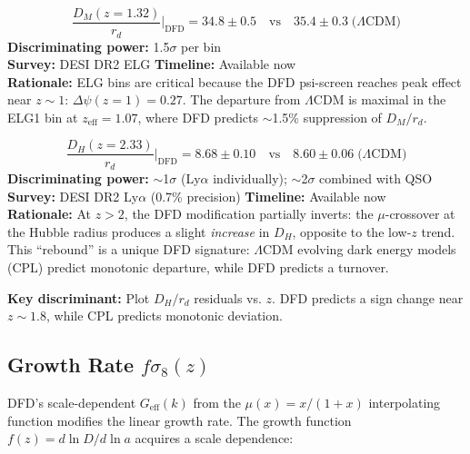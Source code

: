 \documentclass[12pt]{article}
\newcommand{\LCDM}{$\Lambda$CDM}
\begin{document}
\begin{predbox}[Prediction D3: BAO --- ELG ($z_\mathrm{eff}=1.07$, $1.32$)]
\begin{equation}
\boxed{
\frac{D_M(z=1.32)}{r_d}\bigg|_\mathrm{DFD} = 34.8 \pm 0.5 \quad\text{vs}\quad 35.4 \pm 0.3 \;\text{(\LCDM)}
}
\end{equation}
\textbf{Discriminating power:} 1.5$\sigma$ per bin\\
\textbf{Survey:} DESI DR2 ELG \quad\textbf{Timeline:} Available now\\
\textbf{Rationale:} ELG bins are critical because the DFD psi-screen reaches peak effect near $z\sim1$: $\Delta\psi(z=1)=0.27$. The departure from \LCDM{} is maximal in the ELG1 bin at $z_\mathrm{eff}=1.07$, where DFD predicts $\sim$1.5\% suppression of $D_M/r_d$.
\end{predbox}

\begin{predbox}[Prediction D4: BAO --- QSO ($z_\mathrm{eff}=1.49$) and Ly$\alpha$ ($z_\mathrm{eff}=2.33$)]
\begin{equation}
\boxed{
\frac{D_H(z=2.33)}{r_d}\bigg|_\mathrm{DFD} = 8.68 \pm 0.10 \quad\text{vs}\quad 8.60 \pm 0.06 \;\text{(\LCDM)}
}
\end{equation}
\textbf{Discriminating power:} $\sim$1$\sigma$ (Ly$\alpha$ individually); $\sim$2$\sigma$ combined with QSO\\
\textbf{Survey:} DESI DR2 Ly$\alpha$ (0.7\% precision) \quad\textbf{Timeline:} Available now\\
\textbf{Rationale:} At $z>2$, the DFD modification partially inverts: the $\mu$-crossover at the Hubble radius produces a slight \emph{increase} in $D_H$, opposite to the low-$z$ trend. This ``rebound'' is a unique DFD signature: \LCDM{} evolving dark energy models (CPL) predict monotonic departure, while DFD predicts a turnover.

\medskip\noindent
\textbf{Key discriminant:} Plot $D_H/r_d$ residuals vs. $z$. DFD predicts a sign change near $z\sim1.8$, while CPL predicts monotonic deviation.
\end{predbox}

\subsection{Growth Rate $f\sigma_8(z)$}

DFD's scale-dependent $G_\mathrm{eff}(k)$ from the $\mu(x)=x/(1+x)$ interpolating function modifies the linear growth rate. The growth function $f(z) = d\ln D/d\ln a$ acquires a scale dependence:
\end{document}
